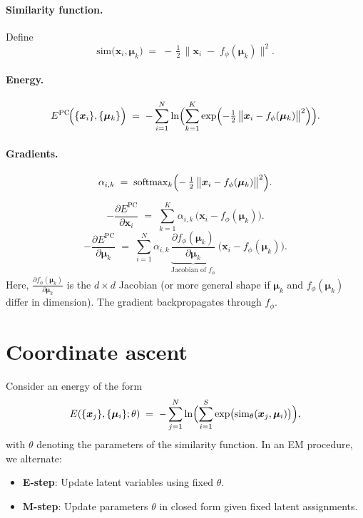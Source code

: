 \documentclass{article}
\begin{document}
\paragraph{Similarity function.}
Define
\[
\mathrm{sim}\bigl(\bm{x}_i,\bm{\mu}_k\bigr)
\;=\;
-\,\tfrac12\,
\bigl\|\bm{x}_i \;-\; f_\phi(\bm{\mu}_k)\bigr\|^2.
\]

\paragraph{Energy.}
\begin{equation}
E^{\mathrm{PC}}\!\Bigl(\{\bm{x}_i\}, \{\bm{\mu}_k\}\Bigr)
\;=\;
-\sum_{i=1}^N
\ln \Bigl(\sum_{k=1}^K
\exp\Bigl(-\tfrac12\,\bigl\|\bm{x}_i - f_\phi(\bm{\mu}_k)\bigr\|^2\Bigr)\Bigr).
\end{equation}

\paragraph{Gradients.}
\[
\alpha_{i,k}
\;=\;
\mathrm{softmax}_k\Bigl(
-\,\tfrac12\,\bigl\|\bm{x}_i - f_\phi(\bm{\mu}_k)\bigr\|^2
\Bigr).
\]

\[
-\frac{\partial E^{\mathrm{PC}}}{\partial \bm{x}_i}
\;=\;
\sum_{k=1}^K 
\alpha_{i,k}\,\bigl(\bm{x}_i - f_\phi(\bm{\mu}_k)\bigr).
\]
\[
-\frac{\partial E^{\mathrm{PC}}}{\partial \bm{\mu}_k}
\;=\;
\sum_{i=1}^N 
\alpha_{i,k}\,
\underbrace{
\frac{\partial f_\phi(\bm{\mu}_k)}{\partial \bm{\mu}_k}
}_{\text{Jacobian of }f_\phi}
\;\bigl(\bm{x}_i - f_\phi(\bm{\mu}_k)\bigr).
\]
Here, \(\tfrac{\partial f_\phi(\bm{\mu}_k)}{\partial \bm{\mu}_k}\) is the \(d\times d\) Jacobian (or more general shape if \(\bm{\mu}_k\) and \(f_\phi(\bm{\mu}_k)\) differ in dimension).  The gradient backpropagates through \(f_\phi\).


    \section{Coordinate ascent}
    \label{sec:generic-slot-attention-em}
    
    Consider an energy of the form
    \[
    E(\{\bm{x}_j\}, \{\bm{\mu}_i\}; \theta)
    \;=\;
    -\sum_{j=1}^N
    \ln\Bigl(\sum_{i=1}^S
    \exp\bigl(\mathrm{sim}_\theta(\bm{x}_j,\bm{\mu}_i)\bigr)\Bigr),
    \]
    with \(\theta\) denoting the parameters of the similarity function. In an EM procedure, we alternate:
    \begin{itemize}
        \item \textbf{E-step}: Update latent variables using fixed \(\theta\).
        \item \textbf{M-step}: Update parameters \(\theta\) in closed form given fixed latent assignments.
    \end{itemize}
    
\end{document}
